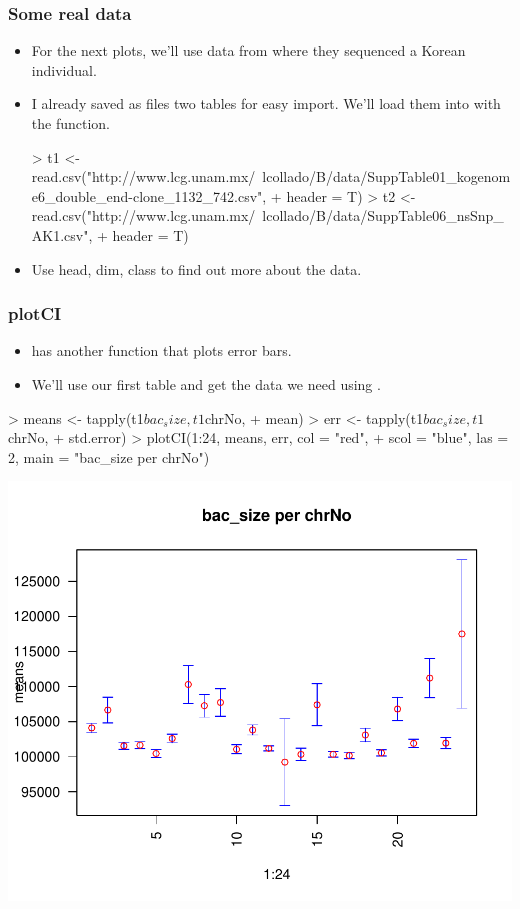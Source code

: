 \begin{frame}
  \frametitle{Some real data}
  \begin{itemize}
  \item For the next plots, we'll use data from  where they sequenced a Korean individual.
  \item I already saved as  files two tables for easy import. We'll load them into  with the  function. \scriptsize
\begin{Schunk}
\begin{Sinput}
> t1 <- read.csv("http://www.lcg.unam.mx/~lcollado/B/data/SuppTable01_kogenome6_double_end-clone_1132_742.csv", 
+     header = T)
> t2 <- read.csv("http://www.lcg.unam.mx/~lcollado/B/data/SuppTable06_nsSnp_AK1.csv", 
+     header = T)
\end{Sinput}
\end{Schunk}
  \item \normalsize Use \alert{head}, \alert{dim}, \alert{class} to find out more about the data.
  \end{itemize}
\end{frame}

\begin{frame}
  \frametitle{plotCI}
  \begin{itemize}
  \item {} has another function that plots error bars.
  \item We'll use our first table and get the data we need using .
  \end{itemize}
\begin{Schunk}
\begin{Sinput}
> means <- tapply(t1$bac_size, t1$chrNo, 
+     mean)
> err <- tapply(t1$bac_size, t1$chrNo, 
+     std.error)
> plotCI(1:24, means, err, col = "red", 
+     scol = "blue", las = 2, main = "bac_size per chrNo")
\end{Sinput}
\end{Schunk}
\includegraphics{plots/fig-030}
\end{frame}

